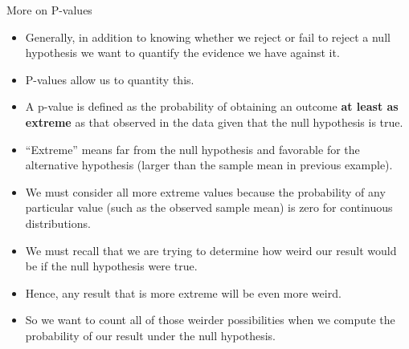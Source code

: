 \documentclass[handout]{beamer}
\begin{document}
\begin{frame}{More on P-values}
\scriptsize{


\begin{itemize}
 \item Generally, in addition to knowing whether we reject or fail to reject a null hypothesis we want to quantify the evidence we have against it.
 \item P-values allow us to quantity this.
 
 \item A p-value is defined as the probability of obtaining an outcome \textbf{at least as extreme} as that observed in the data given that the null hypothesis is true.
 \item ``Extreme'' means far from the null hypothesis and favorable for the alternative hypothesis (larger than the sample mean in previous example).
 
 \item  We must consider all more extreme values because  the probability of any particular value (such as the observed sample mean) is zero for continuous distributions. 
 \item We must recall that we are trying to determine how weird our result would be if the null hypothesis were true.
 \item Hence, any result that is more extreme will be even more weird.
 \item So we want to count all of those weirder possibilities when we compute the probability of our result under the null hypothesis.
  
\end{itemize}



} 
\end{frame}
\end{document}
